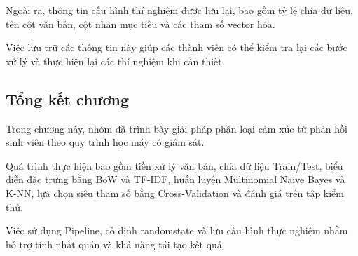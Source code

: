 Ngoài ra, thông tin cấu hình thí nghiệm được lưu lại, bao gồm tỷ lệ chia dữ liệu, tên cột văn bản, cột nhãn mục tiêu và các tham số vector hóa.

Việc lưu trữ các thông tin này giúp các thành viên có thể kiểm tra lại các bước xử lý và thực hiện lại các thí nghiệm khi cần thiết.


\subsection{Tổng kết chương}

Trong chương này, nhóm đã trình bày giải pháp phân loại cảm xúc từ phản hồi sinh viên theo quy trình học máy có giám sát.

Quá trình thực hiện bao gồm tiền xử lý văn bản, chia dữ liệu Train/Test, biểu diễn đặc trưng bằng BoW và TF-IDF, huấn luyện Multinomial Naive Bayes và K-NN, lựa chọn siêu tham số bằng Cross-Validation và đánh giá trên tập kiểm thử.

Việc sử dụng Pipeline, cố định randomstate và lưu cấu hình thực nghiệm nhằm hỗ trợ tính nhất quán và khả năng tái tạo kết quả.
